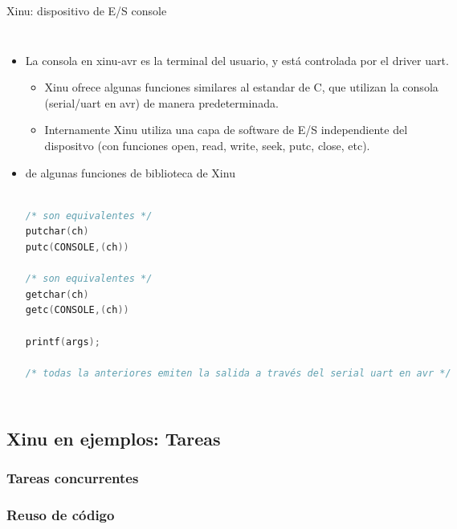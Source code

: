 \documentclass[8pt,aspectratio=169,compress]{beamer}
\begin{document}
\begin{frame}[fragile]{Xinu: dispositivo de E/S console}

    \begin{columns}[onlytextwidth,T]
      \column{\dimexpr\linewidth-60mm-5mm}

	\begin{itemize}
  \item[CONSOLE] La consola en xinu-avr es la terminal del usuario, y está controlada por el driver uart.

\bigskip
\begin{itemize}
\item Xinu ofrece algunas funciones similares al estandar de C, que utilizan la consola (serial/uart en avr) de manera predeterminada.
\item Internamente Xinu utiliza una capa de software de E/S independiente del dispositvo (con funciones open, read, write, seek, putc, close, etc).

\end{itemize}

\bigskip
\item[API] de algunas funciones de biblioteca de Xinu

\begin{lstlisting}[language=c,basicstyle=\footnotesize]

/* son equivalentes */
putchar(ch)     
putc(CONSOLE,(ch))

/* son equivalentes */
getchar(ch)     
getc(CONSOLE,(ch))

printf(args); 

/* todas la anteriores emiten la salida a través del serial uart en avr */
\end{lstlisting}

	\end{itemize}

      \column{50mm}

    \end{columns}
\end{frame}


\subsection{Xinu en ejemplos: Tareas}
\subsubsection{Tareas concurrentes}
\subsubsection{Reuso de código}
\end{document}
